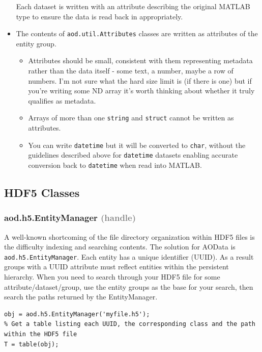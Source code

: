 \documentclass[10pt]{exam}
\newcommand\myparent[1]{\textcolor{gray}{(#1)}}
\newcommand\aodclass[1]{\textcolor{codeblue}{\texttt{#1}}}
\newcommand\matclass[1]{\textcolor{codeblue}{\texttt{#1}}}
\begin{document}
\begin{itemize}
\begin{itemize}
			\end{itemize}
			Each dataset is written with an attribute describing the original MATLAB type to ensure the data is read back in appropriately.
			\item The contents of \aodclass{aod.util.Attributes} classes are written as attributes of the entity group.
			\begin{itemize}
				\item Attributes should be small, consistent with them representing metadata rather than the data itself - some text, a number, maybe a row of numbers. I'm not sure what the hard size limit is (if there is one) but if you're writing some ND array it's worth thinking about whether it truly qualifies as metadata.
				\item Arrays of more than one \matclass{string} and \matclass{struct} cannot be written as attributes.
				\item You can write \matclass{datetime} but it will be converted to \matclass{char}, without the guidelines described above for \matclass{datetime} datasets enabling accurate conversion back to \matclass{datetime} when read into MATLAB.
			\end{itemize}
		\end{itemize}

\subsection{HDF5 Classes}
	\subsubsection{aod.h5.EntityManager \myparent{handle}}\label{subsubsection:EntityManager}
		\noindent A well-known shortcoming of the file directory organization within HDF5 files is the difficulty indexing and searching contents. The solution for AOData is \aodclass{aod.h5.EntityManager}. Each entity has a unique identifier (UUID). As a result groups with a UUID attribute must reflect entities within the persistent hierarchy. When you need to search through your HDF5 file for some attribute/dataset/group, use the entity groups as the base for your search, then search the paths returned by the EntityManager.
	\begin{lstlisting}[style=matlab-editor, basicstyle=\mlttfamily\footnotesize]
obj = aod.h5.EntityManager('myfile.h5');
% Get a table listing each UUID, the corresponding class and the path within the HDF5 file
T = table(obj);
	\end{lstlisting}
\end{document}
